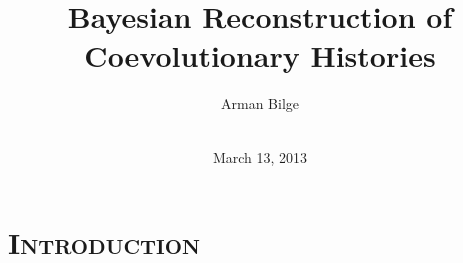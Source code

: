 \documentclass{beamer}
\title[Bayesian Reconstruction of Coevolutionary Histories]{Bayesian Reconstruction of \\ Coevolutionary Histories}
\author{Arman Bilge\vspace{-0.15in}}
\institute[Arman Bilge]{\vspace{-0.25in}}%
\date{\vspace{-0.25in}\\March 13, 2013}
\let\oldsection\section
\renewcommand{\section}[1]{\oldsection{\textsc{#1}}\subsection{}}
\begin{document}
%
%
%
%

\frame{\titlepage}

\section{Introduction}

%
%
%
%
%
\end{document}

